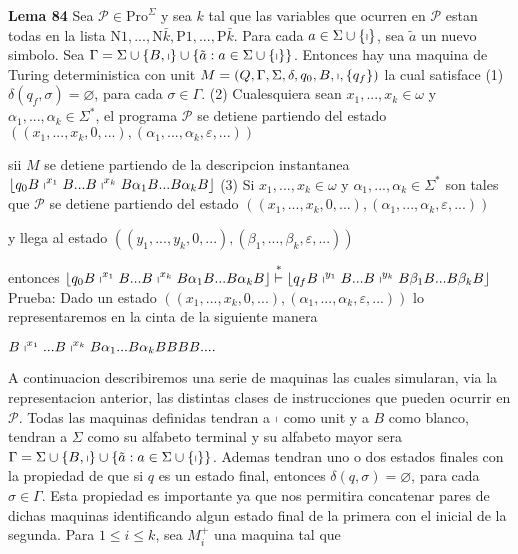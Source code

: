\textbf{Lema 84} Sea \(\mathcal{P}\in \mathrm{Pro}^{\Sigma }\) y sea \(k\) tal que las variables que ocurren en \(\mathcal{P}\) estan todas en la lista \(\mathrm{N}1,..., \mathrm{N}\bar{k},\mathrm{P}1,...,\mathrm{P}\bar{k}.\) Para cada \(a\in \Sigma \cup \{\shortmid \}\), sea \(\tilde{a}\) un nuevo simbolo. Sea \(\Gamma =\Sigma \cup \{B,\shortmid \}\cup \{\tilde{a}:a\in \Sigma \cup \{\shortmid \}\}\). Entonces hay una maquina de Turing deterministica con unit \(M=\left( Q,\Gamma ,\Sigma ,\delta ,q_{0},B,\shortmid ,\{q_{f}\}\right) \) la cual satisface
(1) \(\delta (q_{f},\sigma )=\varnothing \), para cada \(\sigma \in \Gamma \).
(2) Cualesquiera sean \(x_{1},...,x_{k}\in \omega \) y \(\alpha _{1},...,\alpha _{k}\in \Sigma ^{\ast }\), el programa \(\mathcal{P}\) se detiene partiendo del estado
\(\displaystyle \left( (x_{1},...,x_{k},0,...),(\alpha _{1},...,\alpha _{k},\varepsilon ,...)\right) \)

sii \(M\) se detiene partiendo de la descripcion instantanea
\(\displaystyle \left\lfloor q_{0}B\shortmid ^{x_{1}}B...B\shortmid ^{x_{k}}B\alpha _{1}B...B\alpha _{k}B\right\rfloor \)
(3) Si \(x_{1},...,x_{k}\in \omega \) y \(\alpha _{1},...,\alpha _{k}\in \Sigma ^{\ast }\) son tales que \(\mathcal{P}\) se detiene partiendo del estado
\(\displaystyle \left( (x_{1},...,x_{k},0,...),(\alpha _{1},...,\alpha _{k},\varepsilon ,...)\right) \)

y llega al estado
\(\displaystyle \left( (y_{1},...,y_{k},0,...),(\beta _{1},...,\beta _{k},\varepsilon ,...)\right) \)

entonces
\(\displaystyle \left\lfloor q_{0}B\shortmid ^{x_{1}}B...B\shortmid ^{x_{k}}B\alpha _{1}B...B\alpha _{k}B\right\rfloor \overset{\ast }{\vdash }\left\lfloor q_{f}B\shortmid ^{y_{1}}B...B\shortmid ^{y_{k}}B\beta _{1}B...B\beta _{k}B\right\rfloor \)
Prueba: Dado un estado \(((x_{1},...,x_{k},0,...),(\alpha _{1},...,\alpha _{k},\varepsilon ,...))\) lo representaremos en la cinta de la siguiente manera

\(\displaystyle B\shortmid ^{x_{1}}...B\shortmid ^{x_{k}}B\alpha _{1}...B\alpha _{k}BBBB.... \)

A continuacion describiremos una serie de maquinas las cuales simularan, via la representacion anterior, las distintas clases de instrucciones que pueden ocurrir en \(\mathcal{P}\). Todas las maquinas definidas tendran a \(\shortmid \) como unit y a \(B\) como blanco, tendran a \(\Sigma \) como su alfabeto terminal y su alfabeto mayor sera \(\Gamma =\Sigma \cup \{B,\shortmid \}\cup \{\tilde{a }:a\in \Sigma \cup \{\shortmid \}\}\). Ademas tendran uno o dos estados finales con la propiedad de que si \(q\) es un estado final, entonces \(\delta (q,\sigma )=\varnothing \), para cada \(\sigma \in \Gamma \). Esta propiedad es importante ya que nos permitira concatenar pares de dichas maquinas identificando algun estado final de la primera con el inicial de la segunda.
Para \(1\leq i\leq k\), sea \(M_{i}^{+}\) una maquina tal que

